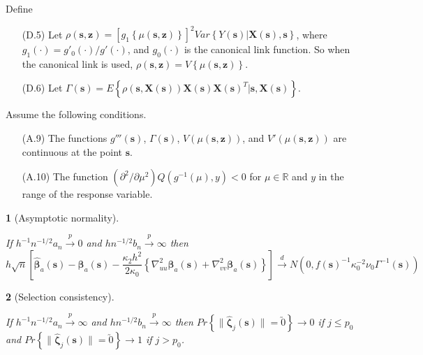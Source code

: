 \documentclass[english]{article}\usepackage[]{graphicx}\usepackage[]{color}
\theoremstyle{plain}
\newtheorem{thm}{\protect\theoremname}
\theoremstyle{plain}
\providecommand{\theoremname}{Theorem}
\begin{document}
Define
\begin{itemize}
\item[(D.5)] Let $\rho\left(\bm{s},\bm{z}\right)=\left[g_{1}\left\{ \mu\left(\bm{s},\bm{z}\right)\right\} \right]^{2}Var\left\{ Y\left(\bm{s}\right)|\bm{X}\left(\bm{s}\right),\bm{s}\right\} $,
where $g_{1}\left(\cdot\right)=g'_{0}\left(\cdot\right)/g'\left(\cdot\right)$,
and $g_{0}\left(\cdot\right)$ is the canonical link function. So
when the canonical link is used, $\rho\left(\bm{s},\bm{z}\right)=V\left\{ \mu\left(\bm{s},\bm{z}\right)\right\} $.
\item[(D.6)] Let $\Gamma\left(\bm{s}\right)=E\left\{ \rho\left(\bm{s},\bm{X}\left(\bm{s}\right)\right)\bm{X}\left(\bm{s}\right)\bm{X}\left(\bm{s}\right)^{T}|\bm{s},\bm{X}\left(\bm{s}\right)\right\} $.
\end{itemize}
Assume the following conditions.
\begin{itemize}
\item[(A.9)] The functions $g'''\left(\bm{s}\right)$, $\Gamma\left(\bm{s}\right)$,
$V\left(\mu\left(\bm{s},\bm{z}\right)\right)$, and $V'\left(\mu\left(\bm{s},\bm{z}\right)\right)$
are continuous at the point $\bm{s}$.
\item[(A.10)] The function $\left(\partial^{2}/\partial\mu^{2}\right)Q\left(g^{-1}\left(\mu\right),y\right)<0$
for $\mu\in\mathbb{R}$ and $y$ in the range of the response variable.\end{itemize}
\begin{thm}[Asymptotic normality]
\label{theorem:normality-glm} 



If $h^{-1}n^{-1/2}a_{n}\xrightarrow{p}0$ and $hn^{-1/2}b_{n}\xrightarrow{p}\infty$
then 
\[
h\sqrt{n}\left[\hat{\bm{\beta}}_{a}(\bm{s})-\bm{\beta}_{a}(\bm{s})-\frac{\kappa_{2}h^{2}}{2\kappa_{0}}\left\{ \nabla_{uu}^{2}\bm{\beta}_{a}(\bm{s})+\nabla_{vv}^{2}\bm{\beta}_{a}(\bm{s})\right\} \right]\xrightarrow{d}N\left(0,f\left(\bm{s}\right)^{-1}\kappa_{0}^{-2}\nu_{0}\Gamma^{-1}(\bm{s})\right)
\]

\end{thm}

\begin{thm}[Selection consistency]
\label{theorem:selection-glm}



If $h^{-1}n^{-1/2}a_{n}\xrightarrow{p}\infty$ and $hn^{-1/2}b_{n}\xrightarrow{p}\infty$
then $Pr\left\{ \|\hat{\bm{\zeta}}_{j}(\bm{s})\|=\utilde{0}\right\} \to0$
if $j\le p_{0}$ and $Pr\left\{ \|\hat{\bm{\zeta}}_{j}(\bm{s})\|=\utilde{0}\right\} \to1$
if $j>p_{0}$. 
\end{thm}
\appendix
\end{document}
